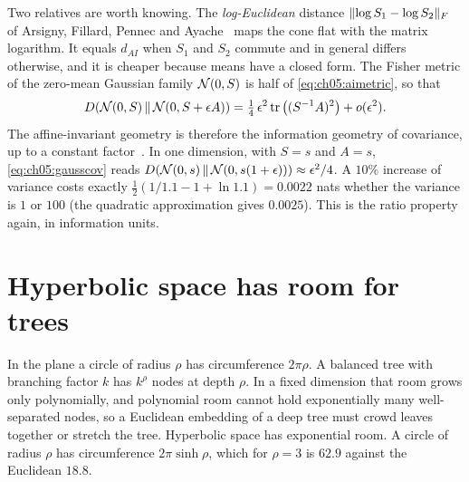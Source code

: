 Two relatives are worth knowing. The \emph{log-Euclidean} distance $\lVert \log S_1-\log S_2\rVert_F$ of Arsigny, Fillard, Pennec and Ayache~\cite{arsigny2007} maps the cone flat with the matrix logarithm. It equals $d_{AI}$ when $S_1$ and $S_2$ commute and in general differs otherwise, and it is cheaper because means have a closed form. The Fisher metric of the zero-mean Gaussian family $\mathcal{N}(0,S)$ is half of \eqref{eq:ch05:aimetric}, so that
\begin{equation}\label{eq:ch05:gausscov}
D\!\left(\mathcal{N}(0,S)\,\middle\|\,\mathcal{N}(0,S+\epsilon A)\right)=\tfrac14\,\epsilon^2\operatorname{tr}\big((S^{-1}A)^2\big)+o(\epsilon^2).
\end{equation}
The affine-invariant geometry is therefore the information geometry of covariance, up to a constant factor~\cite{amari2016}. In one dimension, with $S=s$ and $A=s$, \eqref{eq:ch05:gausscov} reads $D\!\left(\mathcal{N}(0,s)\,\middle\|\,\mathcal{N}(0,s(1+\epsilon))\right)\approx\epsilon^2/4$. A $10\%$ increase of variance costs exactly $\tfrac12(1/1.1-1+\ln1.1)=0.0022$ nats whether the variance is $1$ or $100$ (the quadratic approximation gives $0.0025$). This is the ratio property again, in information units.



\section{Hyperbolic space has room for trees}\label{sec:ch05:hyperbolic}

In the plane a circle of radius $\rho$ has circumference $2\pi\rho$. A balanced tree with branching factor $k$ has $k^\rho$ nodes at depth $\rho$. In a fixed dimension that room grows only polynomially, and polynomial room cannot hold exponentially many well-separated nodes, so a Euclidean embedding of a deep tree must crowd leaves together or stretch the tree. Hyperbolic space has exponential room. A circle of radius $\rho$ has circumference $2\pi\sinh\rho$, which for $\rho=3$ is $62.9$ against the Euclidean $18.8$.

